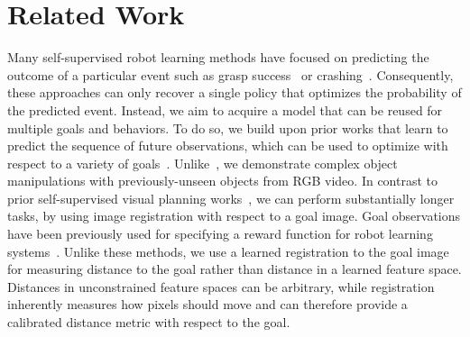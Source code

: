 \section{Related Work}


Many self-supervised robot learning methods have focused on predicting the outcome of a particular event such as grasp success~\cite{lerrel,google_handeye,princeton_pushgrasp} or crashing~\cite{crashing,greg_kahn_uncertainty}. Consequently, these approaches can only recover a single policy that optimizes the probability of the predicted event. Instead, we aim to acquire a model that can be reused for multiple goals and behaviors. To do so, we build upon prior works that learn to predict the sequence of future observations, which can be used to optimize with respect to a variety of goals~\cite{foresight,sna,se3_control}. Unlike~\citet{se3_control}, we demonstrate complex object manipulations with previously-unseen objects from RGB video. In contrast to prior self-supervised visual planning works~\cite{foresight,sna}, we can perform substantially longer tasks, by using image registration with respect to a goal image.
Goal observations have been previously used for specifying a reward function for robot learning systems~\cite{jagersand1995visual,deguchi1999image,e2c,dsae}. Unlike these methods, we use a learned registration to the goal image for measuring distance to the goal rather than distance in a learned feature space. Distances in unconstrained feature spaces can be arbitrary, while registration inherently measures how pixels should move and can therefore provide a calibrated distance metric with respect to the goal. 

